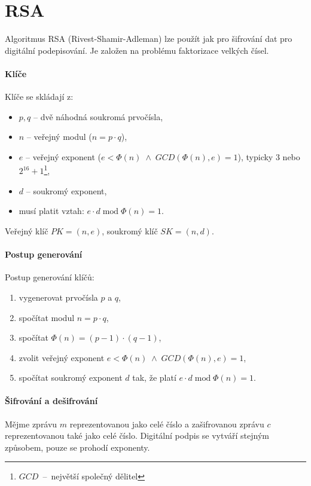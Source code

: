 \section{RSA}

Algoritmus RSA (Rivest-Shamir-Adleman) lze použít jak pro šifrování dat pro digitální podepisování. Je založen na problému faktorizace velkých čísel.

\paragraph*{Klíče} Klíče se skládají z: \begin{itemize}
    \item $p, q$ -- dvě náhodná soukromá prvočísla,
    \item $n$ -- veřejný modul ($n = p \cdot q$),
    \item $e$ -- veřejný exponent ($e < \Phi(n) \; \land \; GCD(\Phi(n), e) = 1$), typicky $3$ nebo $2^{16}+1$\footnote{$GCD$~--~největší společný dělitel},
    \item $d$ -- soukromý exponent,
    \item musí platit vztah: $e \cdot d \; \text{mod} \; \Phi(n) = 1$.
\end{itemize}

\noindent Veřejný klíč $PK = (n, e)$, soukromý klíč $SK = (n, d)$.

\paragraph*{Postup generování} Postup generování klíčů: \begin{enumerate}
    \item vygenerovat prvočísla $p$ a $q$,
    \item spočítat modul $n = p \cdot q$,
    \item spočítat $\Phi(n) = (p-1) \cdot (q-1)$,
    \item zvolit veřejný exponent $e < \Phi(n) \; \land \;GCD(\Phi(n), e) = 1$,
    \item spočítat soukromý exponent $d$ tak, že platí $e \cdot d \; \text{mod} \; \Phi(n) = 1$.
\end{enumerate}

\paragraph*{Šifrování a dešifrování} Mějme zprávu $m$ reprezentovanou jako celé číslo a zašifrovanou zprávu $c$ reprezentovanou také jako celé číslo. Digitální podpis se vytváří stejným způsobem, pouze se prohodí exponenty.

